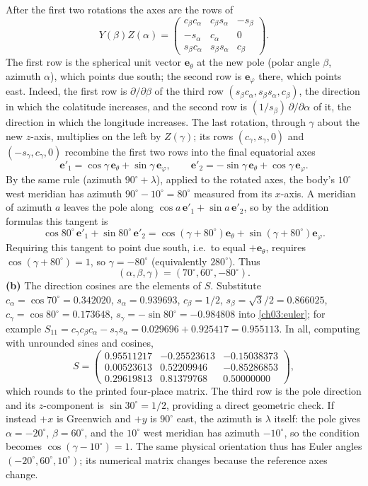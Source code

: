 After the first two rotations the axes are the rows of
\[
Y(\beta)Z(\alpha)=\begin{pmatrix}
c_\beta c_\alpha&c_\beta s_\alpha&-s_\beta\\
-s_\alpha&c_\alpha&0\\
s_\beta c_\alpha&s_\beta s_\alpha&c_\beta
\end{pmatrix}.
\]
The first row is the spherical unit vector $\mathbf e_\theta$ at the
new pole (polar angle $\beta$, azimuth $\alpha$), which points due
south; the second row is $\mathbf e_\varphi$ there, which points east.
Indeed, the first row is $\partial/\partial\beta$ of the third row
$(s_\beta c_\alpha,s_\beta s_\alpha,c_\beta)$, the direction in which
the colatitude increases, and the second row is
$(1/s_\beta)\,\partial/\partial\alpha$ of it, the direction in which the
longitude increases.
The last rotation, through $\gamma$ about the new $z$-axis, multiplies
on the left by $Z(\gamma)$; its rows $(c_\gamma,s_\gamma,0)$ and
$(-s_\gamma,c_\gamma,0)$ recombine the first two rows into the final
equatorial axes
\[
\mathbf e'_1=\cos\gamma\,\mathbf e_\theta+\sin\gamma\,\mathbf e_\varphi,
\qquad
\mathbf e'_2=-\sin\gamma\,\mathbf e_\theta+\cos\gamma\,\mathbf e_\varphi.
\]
By the same rule (azimuth $90^\circ+\lambda$), applied to the rotated
axes, the body's $10^\circ$ west meridian has azimuth
$90^\circ-10^\circ=80^\circ$ measured from its $x$-axis. A meridian of azimuth $a$ leaves the pole
along $\cos a\,\mathbf e'_1+\sin a\,\mathbf e'_2$, so by the addition
formulas this tangent is
\[
\cos80^\circ\,\mathbf e'_1+\sin80^\circ\,\mathbf e'_2
=\cos(\gamma+80^\circ)\mathbf e_\theta
+\sin(\gamma+80^\circ)\mathbf e_\varphi.
\]
Requiring this tangent to point due south, i.e.\ to equal
$+\mathbf e_\theta$, requires $\cos(\gamma+80^\circ)=1$, so
$\gamma=-80^\circ$ (equivalently $280^\circ$).
Thus
\[
\boxed{(\alpha,\beta,\gamma)=(70^\circ,60^\circ,-80^\circ)}.
\]
\textbf{(b)} The direction cosines are the elements of $S$. Substitute
$c_\alpha=\cos70^\circ=0.342020$, $s_\alpha=0.939693$, $c_\beta=1/2$,
$s_\beta=\sqrt3/2=0.866025$, $c_\gamma=\cos80^\circ=0.173648$,
$s_\gamma=-\sin80^\circ=-0.984808$ into \eqref{ch03:euler}; for example
$S_{11}=c_\gamma c_\beta c_\alpha-s_\gamma s_\alpha
=0.029696+0.925417=0.955113$.
In all, computing with unrounded sines and cosines,
\[
\boxed{S=\begin{pmatrix}
0.95511217&-0.25523613&-0.15038373\\
0.00523613&0.52209946&-0.85286853\\
0.29619813&0.81379768&0.50000000
\end{pmatrix}},
\]
which rounds to the printed four-place matrix.
The third row is the pole direction and its $z$-component is
$\sin30^\circ=1/2$, providing a direct geometric check.
If instead $+x$ is Greenwich and $+y$ is $90^\circ$ east, the azimuth
is $\lambda$ itself: the pole gives $\alpha=-20^\circ$, $\beta=60^\circ$,
and the $10^\circ$ west meridian has azimuth $-10^\circ$, so the
condition becomes $\cos(\gamma-10^\circ)=1$. The same physical
orientation thus has Euler angles $(-20^\circ,60^\circ,10^\circ)$;
its numerical matrix changes because the reference axes change.


